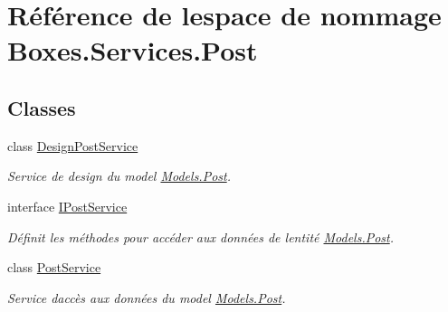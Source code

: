 \hypertarget{namespace_boxes_1_1_services_1_1_post}{}\section{Référence de l\textquotesingle{}espace de nommage Boxes.\+Services.\+Post}
\label{namespace_boxes_1_1_services_1_1_post}
\subsection*{Classes}
\begin{DoxyCompactItemize}
\item 
class \hyperlink{class_boxes_1_1_services_1_1_post_1_1_design_post_service}{Design\+Post\+Service}
\begin{DoxyCompactList}\small\item\em Service de design du model \hyperlink{class_boxes_1_1_models_1_1_post}{Models.\+Post}. \end{DoxyCompactList}\item 
interface \hyperlink{interface_boxes_1_1_services_1_1_post_1_1_i_post_service}{I\+Post\+Service}
\begin{DoxyCompactList}\small\item\em Définit les méthodes pour accéder aux données de l\textquotesingle{}entité \hyperlink{class_boxes_1_1_models_1_1_post}{Models.\+Post}. \end{DoxyCompactList}\item 
class \hyperlink{class_boxes_1_1_services_1_1_post_1_1_post_service}{Post\+Service}
\begin{DoxyCompactList}\small\item\em Service d\textquotesingle{}accès aux données du model \hyperlink{class_boxes_1_1_models_1_1_post}{Models.\+Post}. \end{DoxyCompactList}\end{DoxyCompactItemize}
